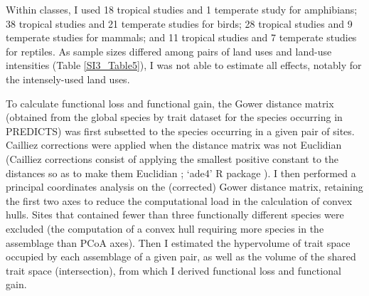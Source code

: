 Within classes, I used 18 tropical studies and 1 temperate study for amphibians; 38 tropical studies and 21 temperate studies for birds; 28 tropical studies and 9 temperate studies for mammals; and 11 tropical studies and 7 temperate studies for reptiles. As sample sizes differed among pairs of land uses and land-use intensities (Table \ref{SI3_Table5}), I was not able to estimate all effects, notably for the intensely-used land uses. 

To calculate functional loss and functional gain, the Gower distance matrix (obtained from the global species by trait dataset for the species occurring in PREDICTS) was first subsetted to the species occurring in a given pair of sites. Cailliez corrections were applied when the distance matrix was not Euclidian (Cailliez corrections consist of applying the smallest positive constant to the distances so as to make them Euclidian \citep{Cailliez1983}; `ade4' R package \citep{ade4package}). I then performed a principal coordinates analysis on the (corrected) Gower distance matrix, retaining the first two axes to reduce the computational load in the calculation of convex hulls. Sites that contained fewer than three functionally different species were excluded (the computation of a convex hull requiring more species in the assemblage than PCoA axes). Then I estimated the hypervolume of trait space occupied by each assemblage of a given pair, as well as the volume of the shared trait space (intersection), from which I derived functional loss and functional gain.

